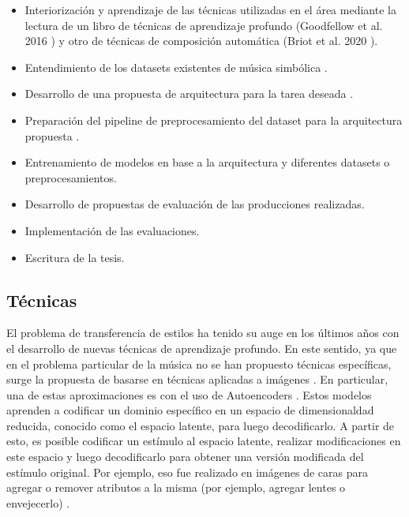 \documentclass[10pt]{article}
\begin{document}
\begin{itemize}
\item Interiorización y aprendizaje de las técnicas utilizadas en el área
  mediante la lectura de un libro de técnicas de aprendizaje profundo
  (Goodfellow et al. 2016 \cite{goodfellow2016deep}) y otro de técnicas de
  composición automática (Briot et al. 2020 \cite{briot2020deep}).
\item Entendimiento de los datasets existentes de música simbólica  \cite{Cuthbert2010Music21AT}.
\item Desarrollo de una propuesta de arquitectura para la tarea deseada \cite{guo2020variational, roberts2019musicvae}.
\item Preparación del pipeline de preprocesamiento del dataset para la arquitectura propuesta \cite{Cuthbert2010Music21AT}.
\item Entrenamiento de modelos en base a la arquitectura y diferentes datasets o preprocesamientos.
\item Desarrollo de propuestas de evaluación de las producciones realizadas.
\item Implementación de las evaluaciones.
\item Escritura de la tesis.
\end{itemize}

\subsection*{Técnicas}
El problema de transferencia de estilos ha tenido su auge en los últimos años
con el desarrollo de nuevas técnicas de aprendizaje profundo. En este
sentido, ya que en el problema particular de la música no se han propuesto
técnicas específicas, surge la propuesta de basarse en técnicas aplicadas a
imágenes \cite{briot2020deep}. En particular, una de estas aproximaciones es
con el uso de Autoencoders \cite{goodfellow2016deep}. Estos modelos aprenden a
codificar un dominio específico en un espacio de dimensionaldad reducida,
conocido como el espacio latente, para luego decodificarlo. A partir de esto,
es posible codificar un estímulo al espacio latente, realizar modificaciones
en este espacio y luego decodificarlo para obtener una versión modificada del
estímulo original. Por ejemplo, eso fue realizado en imágenes de caras para
agregar o remover atributos a la misma (por ejemplo, agregar lentes o
envejecerlo) \cite{upchurch2016feature}.
\end{document}
